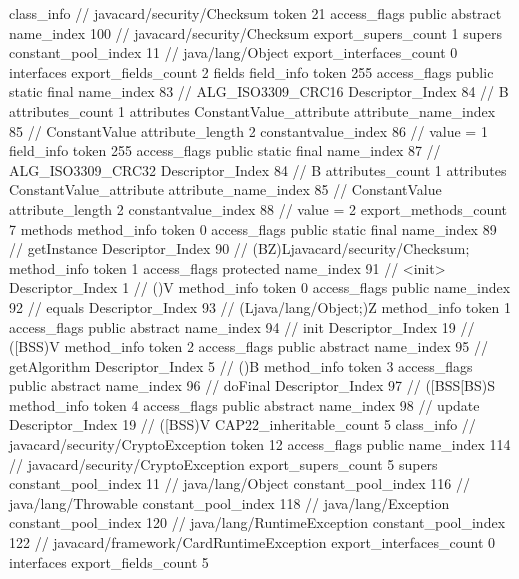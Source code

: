 {{{		}
		class_info {		// javacard/security/Checksum
			token	21
			access_flags	public abstract
			name_index	100		// javacard/security/Checksum
			export_supers_count	1
			supers {
				constant_pool_index	11		// java/lang/Object
			}
			export_interfaces_count	0
			interfaces {
			}
			export_fields_count	2
			fields {
			field_info {
				token	255
				access_flags	public static final
				name_index	83		// ALG_ISO3309_CRC16
				Descriptor_Index	84		// B
				attributes_count	1
				attributes {
				ConstantValue_attribute {
					attribute_name_index	85		// ConstantValue
					attribute_length	2
					constantvalue_index	86		// value = 1
				}
				}
			}
			field_info {
				token	255
				access_flags	public static final
				name_index	87		// ALG_ISO3309_CRC32
				Descriptor_Index	84		// B
				attributes_count	1
				attributes {
				ConstantValue_attribute {
					attribute_name_index	85		// ConstantValue
					attribute_length	2
					constantvalue_index	88		// value = 2
				}
				}
			}
			}
			export_methods_count	7
			methods {
				method_info {
					token	0
					access_flags	public static final
					name_index	89		// getInstance
					Descriptor_Index	90		// (BZ)Ljavacard/security/Checksum;
				}
				method_info {
					token	1
					access_flags	protected
					name_index	91		// <init>
					Descriptor_Index	1		// ()V
				}
				method_info {
					token	0
					access_flags	public
					name_index	92		// equals
					Descriptor_Index	93		// (Ljava/lang/Object;)Z
				}
				method_info {
					token	1
					access_flags	public abstract
					name_index	94		// init
					Descriptor_Index	19		// ([BSS)V
				}
				method_info {
					token	2
					access_flags	public abstract
					name_index	95		// getAlgorithm
					Descriptor_Index	5		// ()B
				}
				method_info {
					token	3
					access_flags	public abstract
					name_index	96		// doFinal
					Descriptor_Index	97		// ([BSS[BS)S
				}
				method_info {
					token	4
					access_flags	public abstract
					name_index	98		// update
					Descriptor_Index	19		// ([BSS)V
				}
			}
			CAP22_inheritable_count	5
		}
		class_info {		// javacard/security/CryptoException
			token	12
			access_flags	public
			name_index	114		// javacard/security/CryptoException
			export_supers_count	5
			supers {
				constant_pool_index	11		// java/lang/Object
				constant_pool_index	116		// java/lang/Throwable
				constant_pool_index	118		// java/lang/Exception
				constant_pool_index	120		// java/lang/RuntimeException
				constant_pool_index	122		// javacard/framework/CardRuntimeException
			}
			export_interfaces_count	0
			interfaces {
			}
			export_fields_count	5
}}}

